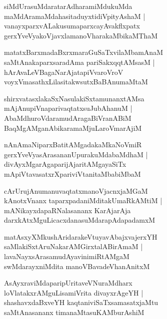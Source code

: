 \documentclass[twoside,12pt,openright]{book}
\newcounter{shloka}[chapter]
\begin{document}
\begin{shloka}%
siMdUrasuMdaratarAdharamiMdukuMda \\
maMdAramaMdahasitaduyxtidiVpityAshaM |\\
vanayxparxvALakusumaparxcayAvakflxpatx \\
gerxYveVyakoVjavxlamanoVharakaMbikaMThaM 
\end{shloka}

\begin{shloka}%
matatxBarxmadaBxrxmaraGuSaTxvilaMbamAnaM \\
saMtAnakaparxsaradAma pariSakxqqtAMsasM |\\
hArAvaLeVBagaNarAjatapiVvaroVroV \\
voyxVmasathxLilasitakwsutxBaBAnumaMtaM
\end{shloka}

\begin{shloka}%
shirxvatasxlakaSxNasulakiSxtamunanxtAMsa \\
mAjAnupiVnaparivaqtatxsuJubAhanuM |\\
AbaMdhuroVdaramudAragaBiVranABiM \\
BaqMgAMganAbikaramaMjuLaroVmarAjiM
\end{shloka}

\begin{shloka}%
nAnAmaNiparxBatitAMgadakaMkaNoVmiR \\
gerxYveVyasArasananUpurakuMdabaMdhaM |\\
divAyxMgarAgaparijAjaritAMgayaSiTx \\
mApiVtavasatxrXpariviVtanitaMbabiMbaM
\end{shloka}

\begin{shloka}%
cArUrujAnumanuvaqtatxmanoVjacnxjaMGaM \\
kAnotxVnanx taparxpadaniMditakUmaRkAMtiM |\\
mANikayxdapaRNalasananx KarAjarAja \\
darxkAtxMguLicacxdanasuMdarapAdapadamxM 
\end{shloka}

\begin{shloka}%
matAsxyXMkushAridarakeVtuyavAbajxvajerxYH \\
saMlakiSxtAruNakarAMGirxtalABirAmaM |\\
lavaNayxsArasamudAyavinimiRtAMgaM \\
swMdarayxniMdita manoVBavadeVhanAnitxM 
\end{shloka}

\begin{shloka}%
AsAyxraviMdaparipUritaveVNuraMdharx \\
loVlatakxrAMguLisamiVrita divayxrAgeYH |\\
shashavxdaBxveYH kaqtaniviSaTxsamasatxjaMtu\\
saMtAnasananx timanaMtasuKAMburAshiM 
\end{shloka}
\end{document}
